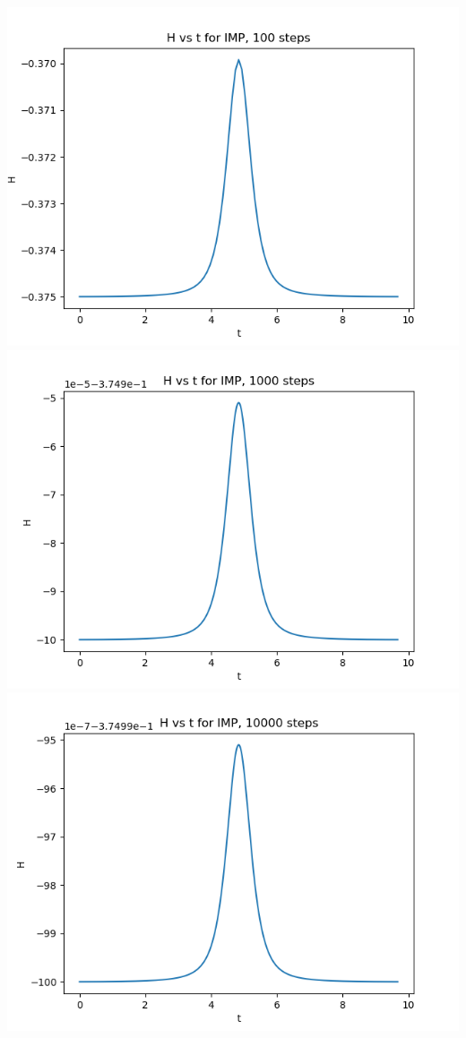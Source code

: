 \documentclass{article}
\begin{document}
\begin{enumerate}
\begin{enumerate}[label=(\alph*)]
\begin{center}
		\includegraphics[scale=.3]{hw5 IMP ham 100 steps}
		\includegraphics[scale=.3]{hw5 IMP ham 1000 steps}
		\includegraphics[scale=.3]{hw5 IMP ham 10000 steps}
	\end{center}
	

\end{enumerate}
\end{enumerate}
\end{document}
